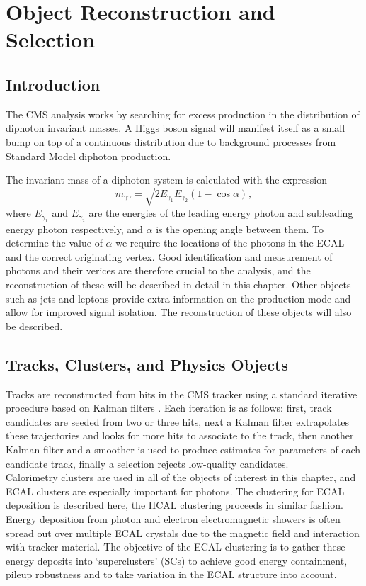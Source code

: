 \chapter{Object Reconstruction and Selection}
\label{chap:object_reco}

\section{Introduction}
The CMS \Hgg analysis works by searching for excess production in the distribution of diphoton invariant masses. A Higgs boson signal will manifest itself as a small bump on top of a continuous distribution due to background processes from Standard Model diphoton production.

The invariant mass of a diphoton system is calculated with the expression
\begin{equation}
    m_{\gamma\gamma} = \sqrt{2E_{\gamma_1}E_{\gamma_2}(1-\cos{\alpha})},
\end{equation}
where $E_{\gamma_1}$ and $E_{\gamma_2}$ are the energies of the leading energy photon and subleading energy photon respectively, and $\alpha$ is the opening angle between them. 
To determine the value of $\alpha$ we require the locations of the photons in the ECAL and the correct originating vertex. 
Good identification and measurement of photons and their verices are therefore crucial to the analysis, and the reconstruction of these will be described in detail in this chapter. 
Other objects such as jets and leptons provide extra information on the production mode and allow for improved signal isolation. The reconstruction of these objects will also be described.

\section{Tracks, Clusters, and Physics Objects}
Tracks are reconstructed from hits in the CMS tracker using a standard iterative procedure based on Kalman filters \cite{TrackReco}. 
Each iteration is as follows: first, track candidates are seeded from two or three hits, next a Kalman filter extrapolates these trajectories and looks for more hits to associate to the track,
then another Kalman filter and a smoother is used to produce estimates for parameters of each candidate track, finally a selection rejects low-quality candidates.  
\\

Calorimetry clusters are used in all of the objects of interest in this chapter, and ECAL clusters are especially important for photons. 
The clustering for ECAL deposition is described here, the HCAL clustering proceeds in similar fashion. 
Energy deposition from photon and electron electromagnetic showers is often spread out over multiple ECAL crystals due to the magnetic field and interaction with tracker material. 
The objective of the ECAL clustering is to gather these energy deposits into `superclusters' (SCs) to achieve good energy containment, pileup robustness and to take variation in the ECAL structure into account.


